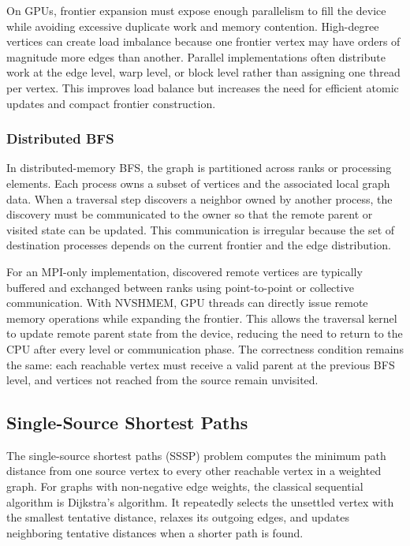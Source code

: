 \documentclass{article}
\begin{document}
On GPUs, frontier expansion must expose enough parallelism to fill the device while avoiding excessive duplicate work and memory contention. High-degree vertices can create load imbalance because one frontier vertex may have orders of magnitude more edges than another. Parallel implementations often distribute work at the edge level, warp level, or block level rather than assigning one thread per vertex. This improves load balance but increases the need for efficient atomic updates and compact frontier construction.

\subsubsection*{Distributed BFS}

In distributed-memory BFS, the graph is partitioned across ranks or processing elements. Each process owns a subset of vertices and the associated local graph data. When a traversal step discovers a neighbor owned by another process, the discovery must be communicated to the owner so that the remote parent or visited state can be updated. This communication is irregular because the set of destination processes depends on the current frontier and the edge distribution.

For an MPI-only implementation, discovered remote vertices are typically buffered and exchanged between ranks using point-to-point or collective communication. With NVSHMEM, GPU threads can directly issue remote memory operations while expanding the frontier. This allows the traversal kernel to update remote parent state from the device, reducing the need to return to the CPU after every level or communication phase. The correctness condition remains the same: each reachable vertex must receive a valid parent at the previous BFS level, and vertices not reached from the source remain unvisited.

\subsection{Single-Source Shortest Paths}

The single-source shortest paths (SSSP) problem computes the minimum path distance from one source vertex to every other reachable vertex in a weighted graph. For graphs with non-negative edge weights, the classical sequential algorithm is Dijkstra's algorithm. It repeatedly selects the unsettled vertex with the smallest tentative distance, relaxes its outgoing edges, and updates neighboring tentative distances when a shorter path is found.
\end{document}
